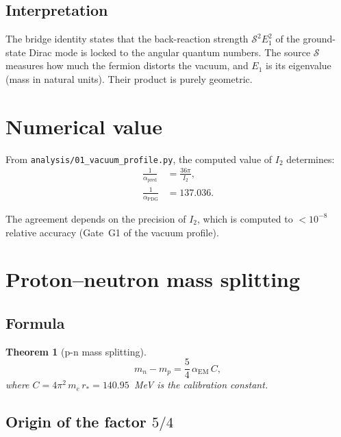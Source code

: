 \documentclass[11pt,letterpaper]{article}
\newtheorem{theorem}{Theorem}[section]
\numberwithin{equation}{section}
\begin{document}
\subsection{Interpretation}

The bridge identity states that the back-reaction strength
$\mathcal{S}^2 E_1^2$ of the ground-state Dirac mode is locked to the
angular quantum numbers. The source $\mathcal{S}$ measures how much
the fermion distorts the vacuum, and $E_1$ is its eigenvalue (mass in
natural units). Their product is purely geometric.

\section{Numerical value}
\label{sec:numerical}

From \texttt{analysis/01\_vacuum\_profile.py}, the computed value of $I_2$
determines:
\begin{align}
  \frac{1}{\alpha_\mathrm{pred}} &= \frac{36\pi}{I_2}, \\
  \frac{1}{\alpha_\mathrm{PDG}} &= 137.036.
\end{align}

The agreement depends on the precision of $I_2$, which is computed to
$< 10^{-8}$ relative accuracy (Gate~G1 of the vacuum profile).

\section{Proton--neutron mass splitting}
\label{sec:pn_splitting}

\subsection{Formula}

\begin{theorem}[p-n mass splitting]
\begin{equation}
\label{eq:pn_split}
\boxed{
  m_n - m_p = \frac{5}{4}\,\alpha_\mathrm{EM}\,C,
}
\end{equation}
where $C = 4\pi^2\,m_e\,r_* = 140.95$~MeV is the calibration constant.
\end{theorem}

\subsection{Origin of the factor $5/4$}
\end{document}
